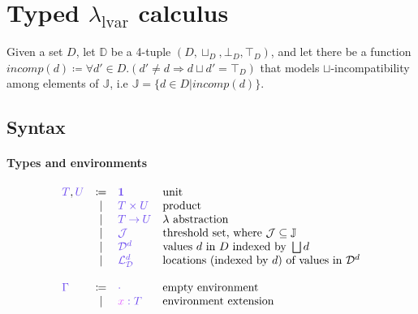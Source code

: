\documentclass[main.tex]{subfiles}
\begin{document}
\section{Typed $\lambda_{\text{lvar}}$ calculus}

Given a set $D$, let $\mathbb{D}$ be a 4-tuple $(D, \sqcup_{D}, \bot_{D},
\top_{D})$, and let there be a function $incomp(d) \coloneqq \forall d' \in
D. (d' \neq d \Rightarrow d \sqcup d' = \top_{D})$ that models $\sqcup$-incompatibility among
elements of $\mathbb{J}$, i.e $\mathbb{J} = \{ d \in D \vert incomp(d) \}$.

\subsection{Syntax}
\label{sec:llam-syntax}

\paragraph{Types and environments}
\[
\begin{array}{lcll}
  \ty{T}, \ty{U}
  & \coloneqq & \ty{\tyunit}        & \text{unit} \\
  & \sep      & \ty{\typrod{T}{U}}  & \text{product} \\
  & \sep      & \ty{\tyfun{T}{U}}   & \lambda \text{ abstraction}\\
  & \sep      & \ty{\tyJ}           & \text{threshold set, where } \tyJ
                                      \subseteq \mathbb{J} \\
  & \sep      & \ty{\tyD{d}}        & \text{values } d \text{ in } D \text{ indexed by }
                                      \bigsqcup d\\
  & \sep      & \ty{\tyL{d}}        & \text{locations (indexed by } d \text{) of
                                      values in } \tyD{d}\\
  \\
  \ty{\Gamma}
  & \coloneqq & \ty{\emptyenv}                 & \text{empty environment}\\
  & \sep      & \ty{\tmty{x}{T}}               & \text{environment extension} \\
\end{array}
\]
\end{document}

